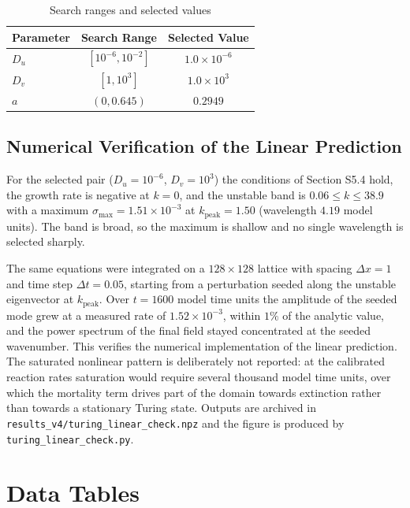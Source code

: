 \documentclass[12pt,a4paper]{article}
\begin{document}
	\begin{table}[H]
		\centering
		\caption{Search ranges and selected values}
		\label{tab:search_supp}
		\begin{tabular}{lcc}
			\toprule
			Parameter & Search Range & Selected Value \\
			\midrule
			$D_u$ & $[10^{-6}, 10^{-2}]$ & $1.0 \times 10^{-6}$ \\
			$D_v$ & $[1, 10^{3}]$ & $1.0 \times 10^{3}$ \\
			$a$ & $(0, 0.645)$ & $0.2949$ \\
			\bottomrule
		\end{tabular}
	\end{table}
	
	\subsection{Numerical Verification of the Linear Prediction}

	For the selected pair ($D_u=10^{-6}$, $D_v=10^{3}$) the conditions of
	Section S5.4 hold, the growth rate is negative at $k=0$, and the unstable band
	is $0.06\le k\le 38.9$ with a maximum $\sigma_{\max}=1.51\times10^{-3}$ at
	$k_{\mathrm{peak}}=1.50$ (wavelength $4.19$ model units). The band is broad,
	so the maximum is shallow and no single wavelength is selected sharply.

	The same equations were integrated on a $128\times128$ lattice with spacing
	$\Delta x=1$ and time step $\Delta t=0.05$, starting from a perturbation seeded
	along the unstable eigenvector at $k_{\mathrm{peak}}$. Over $t=1600$ model time
	units the amplitude of the seeded mode grew at a measured rate of
	$1.52\times10^{-3}$, within $1\%$ of the analytic value, and the power spectrum
	of the final field stayed concentrated at the seeded wavenumber. This verifies
	the numerical implementation of the linear prediction. The saturated nonlinear
	pattern is deliberately not reported: at the calibrated reaction rates
	saturation would require several thousand model time units, over which the
	mortality term drives part of the domain towards extinction rather than towards
	a stationary Turing state. Outputs are archived in
	\texttt{results\_v4/turing\_linear\_check.npz} and the figure is produced by
	\texttt{turing\_linear\_check.py}.

	\section{Data Tables}
	\label{sec:s6_data}
	
\end{document}
